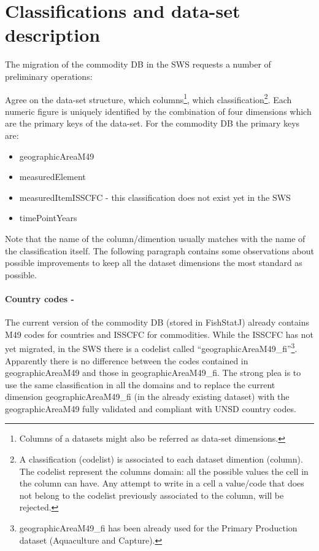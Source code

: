 \documentclass[nojss]{jss}
\begin{document}
\section{Classifications and data-set description}

The migration of the commodity DB in the SWS requests a number of preliminary operations:

\item Agree on the data-set structure, which columns\footnote{Columns of a datasets might also be referred as data-set dimensions.}, which classification\footnote{A classification (codelist) is associated to each dataset dimention (column). The codelist represent the columns domain: all the possible values the cell in the column can have. Any attempt to write in a cell a value/code that does not belong to the codelist previously associated to the column, will be rejected.}. Each numeric figure is uniquely  identified by the combination of four dimensions which are the primary keys of the data-set. For the commodity DB the primary keys are:

\begin{itemize}
\item { geographicAreaM49}
\item { measuredElement} 
\item { measuredItemISSCFC} - this classification does not exist yet in the SWS
\item { timePointYears} 
\end{itemize} 

Note that the name of the column/dimention usually matches with the name of the classification itself.
The following paragraph contains some observations about possible improvements to keep all the dataset dimensions the most standard as possible.

\paragraph{Country codes - } The current version of the commodity DB (stored in FishStatJ) already contains M49 codes for countries and ISSCFC for commodities. While the ISSCFC has not yet migrated, in the SWS there is a codelist called ``geographicAreaM49_fi''\footnote{geographicAreaM49_fi has been already used for the Primary Production dataset (Aquaculture and Capture).}. Apparently there is no difference between the codes contained in geographicAreaM49 and those in geographicAreaM49_fi. The strong plea is to use the same classification in all the domains and to replace the current dimension geographicAreaM49_fi (in the already existing dataset) with the geographicAreaM49 fully validated and compliant with UNSD country codes.
\end{document}

